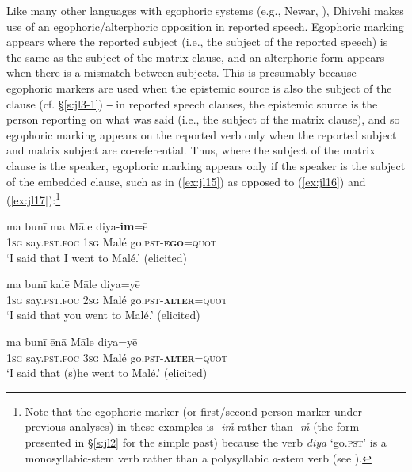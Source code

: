 \documentclass[output=paper]{langsci/langscibook}
\begin{document}
Like many other languages with egophoric systems (e.g., Newar, \citealt{Hale1980}), Dhivehi makes use of an egophoric/alterphoric opposition in reported speech. Egophoric marking appears where the reported subject (i.e., the subject of the reported speech) is the same as the subject of the matrix clause, and an alterphoric form appears when there is a mismatch between subjects. This is presumably because egophoric markers are used when the epistemic source is also the subject of the clause (cf. §\ref{s:jl3-1}) ‒ in reported speech clauses, the epistemic source is the person reporting on what was said (i.e., the subject of the matrix clause), and so egophoric marking appears on the reported verb only when the reported subject and matrix subject are co-referential. Thus, where the subject of the matrix clause is the speaker, egophoric marking appears only if the speaker is the subject of the embedded clause, such as in (\ref{ex:jl15}) as opposed to (\ref{ex:jl16}) and (\ref{ex:jl17}):\footnote{Note that the egophoric marker (or first/second-person marker under previous analyses) in these examples is ‑\textit{im̊} rather than ‑\textit{m̊} (the form presented in §\ref{s:jl‎2} for the simple past) because the verb \textit{diya} ‘go.\textsc{pst}’ is a monosyllabic-stem verb rather than a polysyllabic \textit{a}-stem verb (see \citealt[145--146]{Gnanadesikan2017}).}

\begin{exe}
	\ex 	\label{ex:jl15}
	\gll ma bunī ma Māle diya-\textbf{im}=ē\\
	1\textsc{sg} say.\textsc{pst}.\textsc{foc} 1\textsc{sg} Malé go.\textsc{pst}-\textbf{\textsc{ego}}=\textsc{quot}\\
	\trans ‘I said that I went to Malé.’ (elicited)
\end{exe}

\begin{exe}
	\ex 	\label{ex:jl16}
	\gll ma bunī kalē Māle diya=yē\\
	1\textsc{sg} say.\textsc{pst}.\textsc{foc} 2\textsc{sg} Malé go.\textsc{pst}-\textbf{\textsc{alter}}=\textsc{quot}\\
	\trans ‘I said that you went to Malé.’ (elicited)
\end{exe}

\begin{exe}
	\ex 	\label{ex:jl17}
	\gll ma bunī ēnā Māle diya=yē\\
	1\textsc{sg} say.\textsc{pst}.\textsc{foc} 3\textsc{sg} Malé go.\textsc{pst}-\textbf{\textsc{alter}}=\textsc{quot}\\
	\trans ‘I said that (s)he went to Malé.’ (elicited)
\end{exe}
\end{document}
